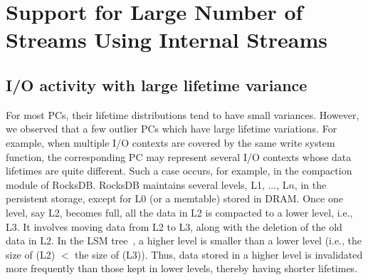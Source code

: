 \section{Support for Large Number of Streams Using Internal Streams}


\subsection{I/O activity with large lifetime variance}
For most PCs, their lifetime distributions tend to have small variances.  
However, we observed that a few outlier PCs which have large lifetime variations. 
For example, when multiple I/O contexts are covered by the same write system function, 
the corresponding PC may represent several I/O contexts whose data lifetimes are quite different.   
Such a case occurs, for example, 
in the compaction module of RocksDB.
RocksDB maintains
several levels, L1, ..., L$n$, in the persistent storage, except for L0 (or a
memtable) stored in DRAM.  Once one level, say L2, becomes full, all the data
in L2 is compacted to a lower level, i.e., L3.  It involves moving data from L2
to L3, along with the deletion of the old data in L2.  In the
LSM tree~\cite{LSM}, a higher level is smaller than a lower level 
(i.e., the size of (L2) $<$ the size of (L3)). 
Thus, data stored in a higher level is invalidated more frequently than those kept
in lower levels, thereby having shorter lifetimes.



